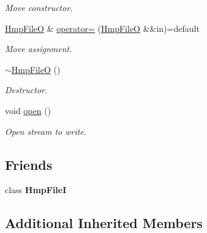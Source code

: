 \begin{DoxyCompactItemize}
\begin{DoxyCompactList}\small\item\em Move constructor. \end{DoxyCompactList}\item 
\mbox{\label{classvarfiles_1_1_hmp_file_o_a42db1e22a209ce62d918688704247376}} 
\hyperlink{classvarfiles_1_1_hmp_file_o}{Hmp\+FileO} \& \hyperlink{classvarfiles_1_1_hmp_file_o_a42db1e22a209ce62d918688704247376}{operator=} (\hyperlink{classvarfiles_1_1_hmp_file_o}{Hmp\+FileO} \&\&in)=default
\begin{DoxyCompactList}\small\item\em Move assignment. \end{DoxyCompactList}\item 
\mbox{\label{classvarfiles_1_1_hmp_file_o_ae7e20a1280d379d275e2f103a5c2dddd}} 
\hyperlink{classvarfiles_1_1_hmp_file_o_ae7e20a1280d379d275e2f103a5c2dddd}{$\sim$\+Hmp\+FileO} ()
\begin{DoxyCompactList}\small\item\em Destructor. \end{DoxyCompactList}\item 
\mbox{\label{classvarfiles_1_1_hmp_file_o_a0d49862be8b4065b99e2795a91fb01b6}} 
void \hyperlink{classvarfiles_1_1_hmp_file_o_a0d49862be8b4065b99e2795a91fb01b6}{open} ()
\begin{DoxyCompactList}\small\item\em Open stream to write. \end{DoxyCompactList}\end{DoxyCompactItemize}
\subsection*{Friends}
\begin{DoxyCompactItemize}
\item 
\mbox{\label{classvarfiles_1_1_hmp_file_o_a1562cc41c56f46e4090775304e4cdfcd}} 
class {\bfseries Hmp\+FileI}
\end{DoxyCompactItemize}
\subsection*{Additional Inherited Members}


